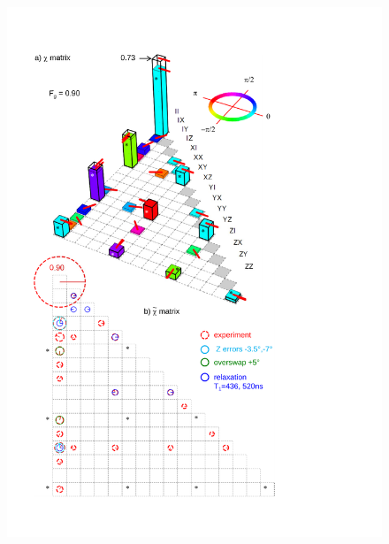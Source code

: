 \begin{figure}
	\centering
		\includegraphics[width=1.\textwidth]{./material/papers/iswap/submission1/Dewes_Figure4}
	\label{fig:iSwap4}
	\caption{}
\end{figure}
